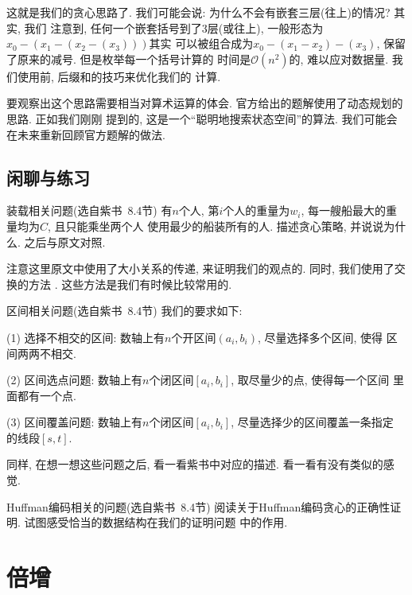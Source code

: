 这就是我们的贪心思路了. 我们可能会说: 为什么不会有嵌套三层(往上)的情况? 其实, 我们 
注意到, 任何一个嵌套括号到了3层(或往上), 一般形态为$x_0-(x_1-(x_2-(x_3)))$其实
可以被组合成为$x_0-(x_1-x_2)-(x_3)$, 保留了原来的减号. 但是枚举每一个括号计算的
时间是$\mathcal O(n^2)$的, 难以应对数据量. 我们使用前, 后缀和的技巧来优化我们的
计算. 

要观察出这个思路需要相当对算术运算的体会. 官方给出的题解使用了动态规划的思路. 
正如我们刚刚
提到的, 这是一个``聪明地搜索状态空间''的算法. 我们可能会在未来重新回顾官方题解的做法.

\subsection*{闲聊与练习} 

\begin{exercise}{装载相关问题(选自紫书\cite{liu2014}~8.4节)}
    有$n$个人, 第$i$个人的重量为$w_i$, 每一艘船最大的重量均为$C$, 且只能乘坐两个人
    使用最少的船装所有的人. 描述贪心策略, 并说说为什么. 之后与原文对照. 

    注意这里原文中使用了大小关系的传递, 来证明我们的观点的. 同时, 我们使用了交换的方法
    . 这些方法是我们有时候比较常用的. 
\end{exercise}

\begin{exercise}{区间相关问题(选自紫书\cite{liu2014}~8.4节)}
    我们的要求如下: 

    (1) 选择不相交的区间: 数轴上有$n$个开区间$(a_i, b_i)$, 尽量选择多个区间, 使得
    区间两两不相交. 

    (2) 区间选点问题: 数轴上有$n$个闭区间$[a_i, b_i]$, 取尽量少的点, 使得每一个区间
    里面都有一个点. 

    (3) 区间覆盖问题: 数轴上有$n$个闭区间$[a_i, b_i]$, 尽量选择少的区间覆盖一条指定
    的线段$[s,t]$. 

    同样, 在想一想这些问题之后, 看一看紫书中对应的描述. 看一看有没有类似的感觉. 
\end{exercise}

\begin{exercise}{Huffman编码相关的问题(选自紫书\cite{liu2014}~8.4节)}
    阅读关于Huffman编码贪心的正确性证明. 试图感受恰当的数据结构在我们的证明问题
    中的作用. 
\end{exercise}

\section{倍增}

